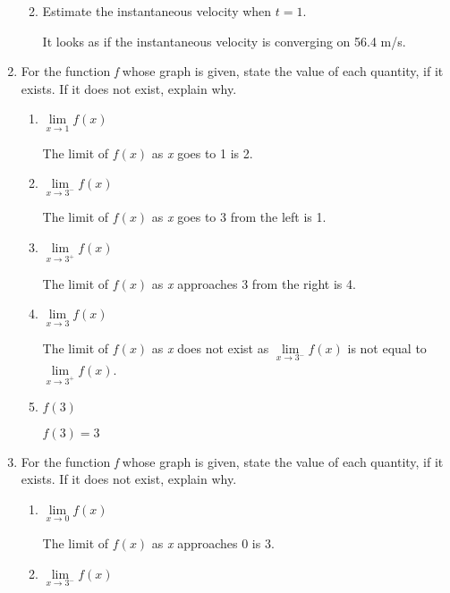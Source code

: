 \documentclass{article}
\begin{document}
\begin{enumerate}
\begin{enumerate}
\begin{enumerate}
				\end{enumerate}
				
				\item Estimate the instantaneous velocity when $t = 1$.
				
					It looks as if the instantaneous velocity is converging on 56.4 m/s.
			\end{enumerate}
			
			\item For the function \emph{f} whose graph is given, state the value of each quantity, if it exists.
				If it does not exist, explain why.
				
				\begin{enumerate}
				
					\item $\lim\limits_{x\to 1} f(x)$
					
						The limit of $f(x)$ as \emph{x} goes to 1 is 2.
						
					\item $\lim\limits_{x \to 3^{-}} f(x)$
					
						The limit of $f(x)$ as \emph{x} goes to 3 from the left is 1.
						
					\item $\lim\limits_{x \to 3^{+}} f(x)$
					
						The limit of $f(x)$ as \emph{x} approaches 3 from the right is 4.
						
					\item $\lim\limits_{x \to 3} f(x)$
					
						The limit of $f(x)$ as \emph{x} does not exist as $\lim\limits_{x \to 3^{-}} f(x)$ is not equal
						to $\lim\limits_{x \to 3^{+}} f(x)$.
						
					\item $f(3)$
					
						$f(3) = 3$
				\end{enumerate}
				
			\item For the function \emph{f} whose graph is given, state the value of each quantity, if it exists. If it does not
				exist, explain why.
				
				\begin{enumerate}
				
					\item $\lim \limits_{x \to 0} f(x)$
					
						The limit of $f(x)$ as \emph{x} approaches 0 is 3.
						
					\item $\lim \limits_{x \to 3^{-}} f(x)$
					

\end{enumerate}
\end{enumerate}
\end{document}
